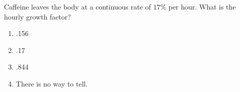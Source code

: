 \bigskip

\item
Caffeine leaves the body at a continuous rate of $17\%$ per hour.  What is the hourly growth factor?

\begin{enumerate}
\item .156
\item .17
\item .844
\item There is no way to tell.
\end{enumerate}

